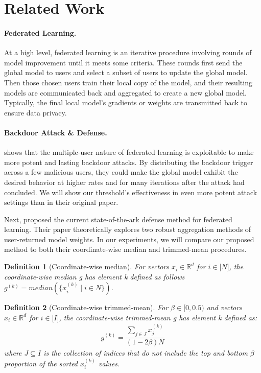 \documentclass{article} %
\newtheorem{definition}{Definition}
\begin{document}
%
\section{Related Work}

\paragraph{Federated Learning.} At a high level, federated learning is an iterative procedure involving rounds of model improvement until it meets some criteria. These rounds first send the global model to users and select a subset of users to update the global model. Then those chosen users train their local copy of the model, and their resulting models are communicated back and aggregated to create a new global model. Typically, the final local model's gradients or weights are transmitted back to ensure data privacy.

\paragraph{Backdoor Attack \& Defense.} \cite{dba} shows that the multiple-user nature of federated learning is exploitable to make more potent and lasting backdoor attacks. By distributing the backdoor trigger across a few malicious users, they could make the global model exhibit the desired behavior at higher rates and for many iterations after the attack had concluded. We will show our threshold's effectiveness in even more potent attack settings than in their original paper.

Next, \cite{trim-mean} proposed the current state-of-the-ark defense method for federated learning. Their paper theoretically explores two robust aggregation methods of user-returned model weights. In our experiments, we will compare our proposed method to both their coordinate-wise median and trimmed-mean procedures.

\begin{definition}[Coordinate-wise median] 
For vectors $x_i \in \mathbb{R}^{d}$ for $i \in \mathopen[N\mathclose]$, the coordinate-wise median g has element k defined as follows $g^{(k)} = median(\{x_i^{(k)} \mid i \in N\})$.
\end{definition}

\begin{definition}[Coordinate-wise trimmed-mean]
For $\beta \in \mathopen[ 0, 0.5 \mathclose)$ and vectors $x_i \in \mathbb{R}^{d}$ for $i \in \mathopen[I\mathclose]$, the coordinate-wise trimmed-mean g has element k defined as:
\begin{align*}
g^{(k)} = \dfrac{\sum_{j \in J}{x_j^{(k)}}}{(1 - 2\beta)N}
\end{align*}
where $J \subseteq I$ is the collection of indices that do not include the top and bottom $\beta$ proportion of the sorted $x_i^{(k)}$ values.
\end{definition}
\end{document}
